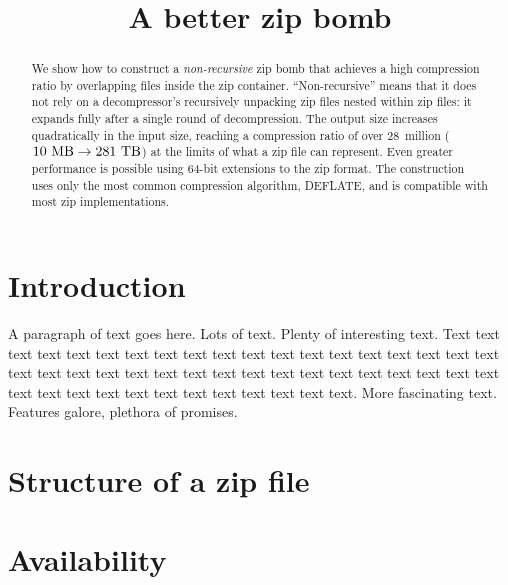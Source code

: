 \documentclass[letterpaper,twocolumn,10pt]{article}
\newcommand{\MB}{\mega\byte}
\newcommand{\TB}{\tera\byte}
\begin{document}
\date{}

\title{\Large \bf A better zip bomb}

\author{
}

\maketitle

\begin{abstract}
We show how to construct a
\emph{non-recursive} zip bomb
that achieves a high compression ratio by
overlapping files inside the zip container.
``Non-recursive'' means that it does not rely on
a decompressor's recursively unpacking zip files nested within zip files:
it expands fully after a single round of decompression.
The output size increases quadratically in the input size,
reaching a compression ratio of over 28~million
($\SI{10}{\MB} \rightarrow \SI{281}{\TB}$)
at the limits of what a zip file can represent.
Even greater performance is possible using
64-bit extensions to the zip format.
The construction uses only the most common compression algorithm, DEFLATE,
and is compatible with most zip implementations.
\end{abstract}


\section{Introduction}

A paragraph of text goes here. Lots of text. Plenty of interesting
text. Text text text text text text text text text text text text text
text text text text text text text text text text text text text text
text text text text text text text text text text text text text text
text text text text text text text.
More fascinating text. Features galore, plethora of promises.

\cite{190996}

\section{Structure of a zip file}


\section*{Availability}




\end{document}
